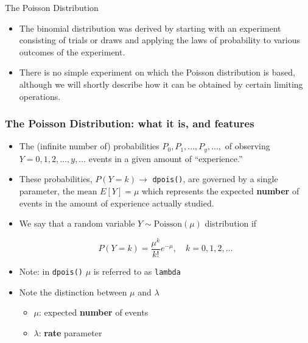 \documentclass[handout]{beamer}\usepackage[]{graphicx}\usepackage[]{color}
\begin{document}
\begin{frame}{The Poisson Distribution}


\begin{itemize}
\setlength\itemsep{1em}
\item The binomial distribution was derived by starting with an experiment consisting of trials or draws and applying the laws of probability to various outcomes of the experiment. \pause 
\item There is no simple experiment on which the Poisson distribution is based, although we will shortly describe how it can be obtained by certain limiting operations.
\end{itemize}

\end{frame}

\begin{frame}
\frametitle{The Poisson Distribution: what it is, and features}

\begin{itemize}
\small
\setlength\itemsep{1em}
\item The (infinite number of) probabilities $P_{0}, P_{1}, ..., P_{y}, ..., $ of observing 
$Y = 0, 1, 2, \dots , y, \dots $ events in a given amount of ``experience.'' \pause

\item These probabilities, $P(Y = k) \to$ \texttt{dpois()}, are governed by a single parameter, the mean $E[Y] = \mu$ which represents the expected \textbf{number} of events in the amount of experience actually studied.\pause 

\item We say that a random variable $Y \sim \textrm{Poisson}(\mu)$ distribution if 

\[ P(Y=k) = \frac{\mu^k}{k!}e^{-\mu}, \quad k = 0, 1, 2, \ldots\]
\pause 

\item Note: in \texttt{dpois()} $\mu$ is referred to as \texttt{lambda}

\item Note the distinction between $\mu$ and $\lambda$
\begin{itemize}
\item $\mu$: expected \textbf{number} of events
\item $\lambda$: \textbf{rate} parameter
\end{itemize}
\end{itemize}
\end{frame}
\end{document}
